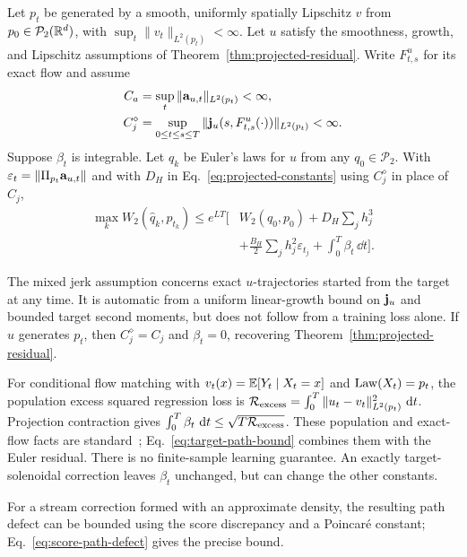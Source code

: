 \begin{theorem}
\label{thm:target-path-bound}
Let $p_t$ be generated by a smooth, uniformly spatially Lipschitz $v$ from
$p_0\in\mathcal P_2(\mathbb R^d)$, with
$\sup_t\|v_t\|_{L^2(p_t)}<\infty$.  Let $u$ satisfy the smoothness,
growth, and Lipschitz assumptions of Theorem~\ref{thm:projected-residual}.
Write $F^u_{t,s}$ for its exact flow and assume
\begin{align*}
 C_a&=\sup_t\|\mathbf a_{u,t}\|_{L^2(p_t)}<\infty,\\
 C_j^\diamond&=
 \sup_{0\le t\le s\le T}
 \|\mathbf j_u(s,F^u_{t,s}(\cdot))\|_{L^2(p_t)}<\infty.
\end{align*}
Suppose $\beta_t$ is integrable.  Let $\widehat q_k$ be Euler's laws for
$u$ from any $q_0\in\mathcal P_2$.  With
$\varepsilon_t=\|\Pi_{p_t}\mathbf a_{u,t}\|$ and with $D_H$ in
Eq.~\eqref{eq:projected-constants} using $C_j^\diamond$ in place of
$C_j$,
\begin{align}
 \max_k W_2(\widehat q_k,p_{t_k})
 \le e^{LT}\bigg[&W_2(q_0,p_0)+D_H\sum_jh_j^3\nonumber\\
                 &+\frac{B_H}{2}\sum_jh_j^2\varepsilon_{t_j}
                  +\int_0^T\beta_t\,\dd t\bigg].
 \label{eq:target-path-bound}
\end{align}
\end{theorem}

The mixed jerk assumption concerns exact $u$-trajectories started from
the target at any time.  It is automatic from a uniform linear-growth
bound on $\mathbf j_u$ and bounded target second moments, but does not follow
from a training loss alone.  If $u$ generates $p_t$, then
$C_j^\diamond=C_j$ and $\beta_t=0$, recovering
Theorem~\ref{thm:projected-residual}.

For conditional flow matching with $v_t(x)=\mathbb E[Y_t\mid X_t=x]$ and
$\operatorname{Law}(X_t)=p_t$, the population excess squared regression loss is
$\mathcal R_{\rm excess}=\int_0^T\|u_t-v_t\|_{L^2(p_t)}^2\,\,\mathrm d t$.
Projection contraction gives
$\int_0^T\beta_t\,\,\mathrm d t\le\sqrt{T\mathcal R_{\rm excess}}$.
These population and exact-flow facts are standard~\citep{lipman2023flow,benton2024error};
Eq.~\eqref{eq:target-path-bound} combines them with the Euler residual.
There is no finite-sample learning guarantee.  An exactly target-solenoidal
correction leaves $\beta_t$ unchanged, but can change the other constants.

For a stream correction formed with an approximate density, the resulting
path defect can be bounded using the score discrepancy and a Poincar\'e
constant; Eq.~\eqref{eq:score-path-defect} gives the precise bound.
